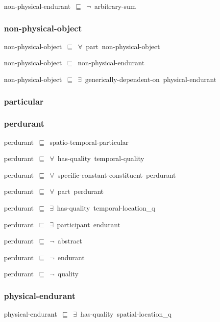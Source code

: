 \documentclass{article}
\begin{document}
non-physical-endurant~\ensuremath{\sqsubseteq}~\ensuremath{\lnot}~arbitrary-sum

\subsubsection*{non-physical-object}

non-physical-object~\ensuremath{\sqsubseteq}~\ensuremath{\forall}~part~non-physical-object~

non-physical-object~\ensuremath{\sqsubseteq}~non-physical-endurant~

non-physical-object~\ensuremath{\sqsubseteq}~\ensuremath{\exists}~generically-dependent-on~physical-endurant~

\subsubsection*{particular}

\subsubsection*{perdurant}

perdurant~\ensuremath{\sqsubseteq}~spatio-temporal-particular~

perdurant~\ensuremath{\sqsubseteq}~\ensuremath{\forall}~has-quality~temporal-quality~

perdurant~\ensuremath{\sqsubseteq}~\ensuremath{\forall}~specific-constant-constituent~perdurant~

perdurant~\ensuremath{\sqsubseteq}~\ensuremath{\forall}~part~perdurant~

perdurant~\ensuremath{\sqsubseteq}~\ensuremath{\exists}~has-quality~temporal-location\_q~

perdurant~\ensuremath{\sqsubseteq}~\ensuremath{\exists}~participant~endurant~

perdurant~\ensuremath{\sqsubseteq}~\ensuremath{\lnot}~abstract

perdurant~\ensuremath{\sqsubseteq}~\ensuremath{\lnot}~endurant

perdurant~\ensuremath{\sqsubseteq}~\ensuremath{\lnot}~quality

\subsubsection*{physical-endurant}

physical-endurant~\ensuremath{\sqsubseteq}~\ensuremath{\exists}~has-quality~spatial-location\_q~
\end{document}
